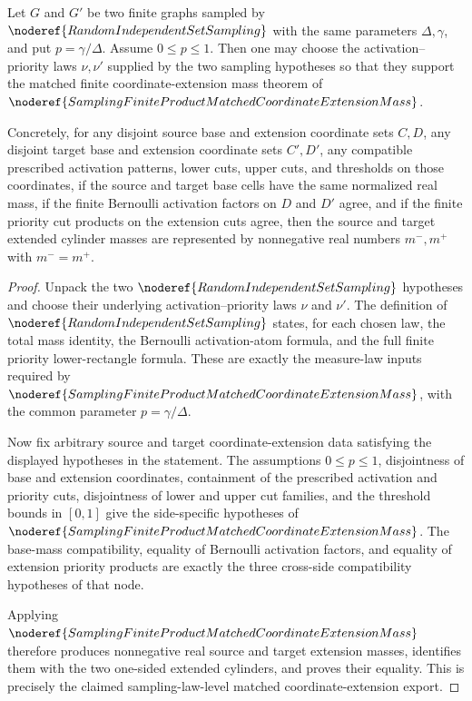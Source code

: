 \begin{lemma}
Let \(G\) and \(G'\) be two finite graphs sampled by
\(\noderef{RandomIndependentSetSampling}\) with the same parameters
\(\Delta,\gamma\), and put \(p=\gamma/\Delta\).  Assume \(0\le p\le1\).
Then one may choose the activation--priority laws \(\nu,\nu'\) supplied by
the two sampling hypotheses so that they support the matched finite
coordinate-extension mass theorem of
\(\noderef{SamplingFiniteProductMatchedCoordinateExtensionMass}\).

Concretely, for any disjoint source base and extension coordinate sets
\(C,D\), any disjoint target base and extension coordinate sets \(C',D'\),
any compatible prescribed activation patterns, lower cuts, upper cuts, and
thresholds on those coordinates, if the source and target base cells have
the same normalized real mass, if the finite Bernoulli activation factors on
\(D\) and \(D'\) agree, and if the finite priority cut products on the
extension cuts agree, then the source and target extended cylinder masses are
represented by nonnegative real numbers \(m^-,m^+\) with \(m^-=m^+\).
\end{lemma}
\begin{proof}
Unpack the two \(\noderef{RandomIndependentSetSampling}\) hypotheses and
choose their underlying activation--priority laws \(\nu\) and \(\nu'\).
The definition of \(\noderef{RandomIndependentSetSampling}\) states, for
each chosen law, the total mass identity, the Bernoulli activation-atom
formula, and the full finite priority lower-rectangle formula.  These are
exactly the measure-law inputs required by
\(\noderef{SamplingFiniteProductMatchedCoordinateExtensionMass}\), with the
common parameter \(p=\gamma/\Delta\).

Now fix arbitrary source and target coordinate-extension data satisfying the
displayed hypotheses in the statement.  The assumptions \(0\le p\le1\),
disjointness of base and extension coordinates, containment of the prescribed
activation and priority cuts, disjointness of lower and upper cut families,
and the threshold bounds in \([0,1]\) give the side-specific hypotheses of
\(\noderef{SamplingFiniteProductMatchedCoordinateExtensionMass}\).  The
base-mass compatibility, equality of Bernoulli activation factors, and
equality of extension priority products are exactly the three cross-side
compatibility hypotheses of that node.

Applying \(\noderef{SamplingFiniteProductMatchedCoordinateExtensionMass}\)
therefore produces nonnegative real source and target extension masses,
identifies them with the two one-sided extended cylinders, and proves their
equality.  This is precisely the claimed sampling-law-level matched
coordinate-extension export.
\end{proof}
